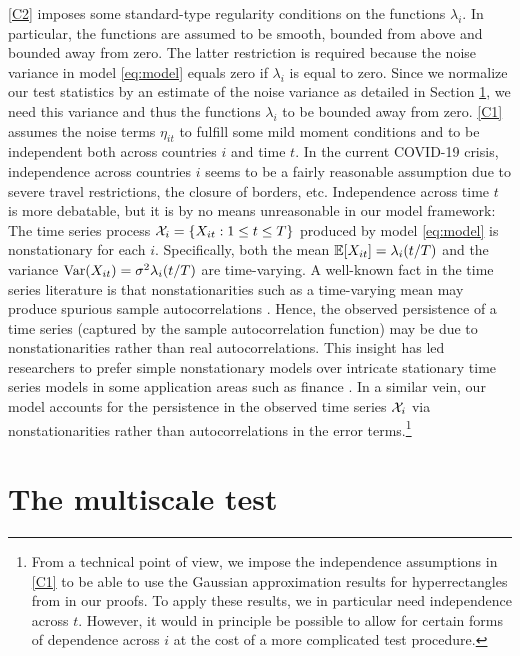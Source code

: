 \documentclass[a4paper,12pt]{article}
\numberwithin{equation}{section}
\begin{document}
\ref{C2} imposes some standard-type regularity conditions on the functions $\lambda_i$. In particular, the functions are assumed to be smooth, bounded from above and bounded away from zero. The latter restriction is required because the noise variance in model \eqref{eq:model} equals zero if $\lambda_i$ is equal to zero. Since we normalize our test statistics by an estimate of the noise variance as detailed in Section \ref{sec:test}, we need this variance and thus the functions $\lambda_i$ to be bounded away from zero. \ref{C1} assumes the noise terms $\eta_{it}$ to fulfill some mild moment conditions and to be independent both across countries $i$ and time $t$. In the current COVID-19 crisis, independence across countries $i$ seems to be a fairly reasonable assumption due to severe travel restrictions, the closure of borders, etc. Independence across time $t$ is more debatable, but it is by no means unreasonable in our model framework: The time series process $\mathcal{X}_i = \{X_{it}: 1 \le t \le T\}$ produced by model \eqref{eq:model} is nonstationary for each $i$. Specifically, both the mean $\mathbb{E}[X_{it}] = \lambda_i(t/T)$ and the variance $\textnormal{Var}(X_{it}) = \sigma^2 \lambda_i(t/T)$ are time-varying. A well-known fact in the time series literature is that nonstationarities such as a time-varying mean may produce spurious sample autocorrelations {\color{red}\citep[see e.g.][]{MikoschStarica2004, Fryzlewicz2008}}. Hence, the observed persistence of a time series (captured by the sample autocorrelation function) may be due to nonstationarities rather than real autocorrelations. This insight has led researchers to prefer simple nonstationary models over intricate stationary time series models in some application areas such as finance {\color{red}\citep[see e.g.][]{MikoschStarica2000, MikoschStarica2004, Fryzlewicz2006, HafnerLinton2010}}. In a similar vein, our model accounts for the persistence in the observed time series $\mathcal{X}_i$ via nonstationarities rather than autocorrelations in the error terms.\footnote{{\color{red} From a technical point of view, we impose the independence assumptions in \ref{C1} to be able to use the Gaussian approximation results for hyperrectangles from \cite{Chernozhukov2017} in our proofs. To apply these results, we in particular need independence across $t$. However, it would in principle be possible to allow for certain forms of dependence across $i$ at the cost of a more complicated test procedure.}}

 

\section{The multiscale test}\label{sec:test}
\end{document}
